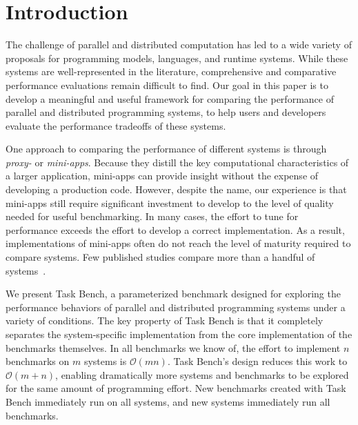 \section{Introduction}
\label{sec:introduction}

The challenge of parallel and distributed computation has led to a
wide variety of proposals for programming models, languages, and
runtime systems. While these systems are well-represented in the literature, comprehensive and comparative performance evaluations
remain difficult to find. Our
goal in this paper is to develop a meaningful and useful framework for
comparing the performance of parallel and distributed programming
systems, to help users and developers evaluate the performance tradeoffs of these systems.

One approach to comparing the performance of different systems is through \emph{proxy-} or
\emph{mini-apps}. Because they distill the key computational characteristics of a larger
application, mini-apps can provide insight
without the expense of developing a production code. However, despite the name, our experience is that
mini-apps still require significant investment to develop
to the level of quality needed for useful benchmarking. In many cases,
the effort to tune for performance exceeds the effort to develop a correct implementation. As a result, implementations of mini-apps
often do not reach the level of maturity required to compare
systems. Few published studies compare more than a handful of systems~\cite{LULESH13}.

We present Task Bench, a parameterized benchmark designed for exploring the performance
behaviors of parallel and distributed programming systems under a
variety of conditions.  The key property of Task Bench is that it completely separates
the system-specific implementation from the core implementation
of the benchmarks themselves.
In all benchmarks we know of, the effort to implement $n$ benchmarks on $m$
systems is $\mathcal{O}(mn)$.  Task Bench's design reduces this work to $\mathcal{O}(m + n)$,
enabling dramatically more systems and benchmarks to be explored for the same amount of programming
effort.  New benchmarks created with Task Bench
immediately run on all systems, and new systems immediately run all
benchmarks. 

